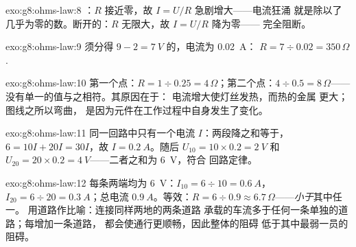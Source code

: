 \begin{solution}{exo:g8:ohms-law:8}
：$R$ 接近零，故 $I = U/R$ 急剧增大——电流狂涌
就是除以了几乎为零的数。断开的：$R$
无限大，故 $I = U/R$ 降为零——
完全阻断。
\end{solution}

\begin{solution}{exo:g8:ohms-law:9}
须分得 $9 - 2 = \qty{7}{V}$ 的，电流为 \qty{0.02}{A}：
$R = 7 \div 0.02 = 350\,\Omega$.
\end{solution}

\begin{solution}{exo:g8:ohms-law:10}
第一个点：$R = 1 \div 0.25 = 4\,\Omega$；第二个点：$4 \div
0.5 = 8\,\Omega$——没有单一的值与之相符。其原因在于：
电流增大使灯丝发热，而热的金属
更大；图线之所以弯曲，
是因为元件在工作过程中自身发生了变化。
\end{solution}

\begin{solution}{exo:g8:ohms-law:11}
同一回路中只有一个电流 $I$：两段降之和等于，
$6 = 10 I + 20 I = 30 I$，故 $I = \qty{0.2}{A}$。随后 $U_{10}
= 10 \times 0.2 = \qty{2}{V}$ 和 $U_{20} = 20 \times 0.2 =
\qty{4}{V}$——二者之和为 \qty{6}{V}，符合
回路定律。
\end{solution}

\begin{solution}{exo:g8:ohms-law:12}
每条两端均为 \qty{6}{V}：$I_{10} = 6 \div 10 =
\qty{0.6}{A}$，$I_{20} = 6 \div 20 = \qty{0.3}{A}$；总电流
$\qty{0.9}{A}$。等效：$R = 6 \div 0.9 \approx
6.7\,\Omega$——\emph{小于}其中任一。
用道路作比喻：连接同样两地的两条道路
承载的车流多于任何一条单独的道路；每增加一条道路，
都会使通行更顺畅，因此整体的阻碍
低于其中最弱一员的阻碍。
\end{solution}

